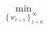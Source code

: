 \documentclass[preview]{standalone}
\begin{document}
\begin{align*}
\min_{\left\{w_{t+1}\right\}_{t=0}^{\infty}}
\end{align*}
\end{document}
